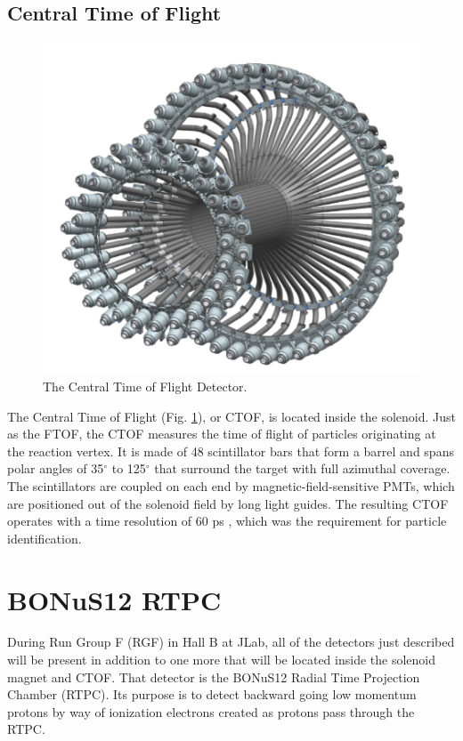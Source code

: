 \subsection{Central Time of Flight}
\begin{figure}[h!]
 	\centering
 	\includegraphics[width=0.8\linewidth]{figures/ctof.png}
 	\caption[The Central Time of Flight Detector.]{\label{fig:ctof}The Central Time of Flight Detector\cite{clas12:CTOF}.}
\end{figure}
The Central Time of Flight (Fig. \ref{fig:ctof}), or CTOF, is located inside the solenoid. Just as the FTOF, the CTOF measures the time of flight of particles originating at the reaction vertex. It is made of 48 scintillator bars that form a barrel and spans polar angles of 35$^{\circ}$ to 125$^{\circ}$ that surround the target with full azimuthal coverage. The scintillators are coupled on each end by magnetic-field-sensitive PMTs, which are positioned out of the solenoid field by long light guides. The resulting CTOF operates with a time resolution of 60 ps \cite{clas12:CTOF}, which was the requirement for particle identification.

\section{BONuS12 RTPC}
During Run Group F (RGF) in Hall B at JLab, all of the detectors just described will be present in addition to one more that will be located inside the solenoid magnet and CTOF. That detector is the BONuS12 Radial Time Projection Chamber (RTPC). Its purpose is to detect backward going low momentum protons by way of ionization electrons created as protons pass through the RTPC.

